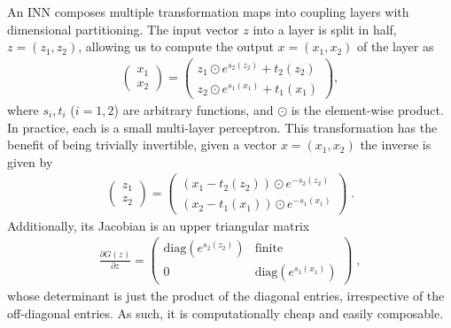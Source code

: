 An INN composes multiple transformation maps into coupling layers with
dimensional partitioning. The input vector $z$ into a layer is split in
half, $z = (z_1,z_2)$, allowing us to compute the output $x=(x_1,x_2)$
of the layer as
%
\begin{align}
\begin{pmatrix} x_1 \\ x_2 \end{pmatrix} =
\begin{pmatrix}
z_1 \odot e^{s_2(z_2)} + t_2(z_2) \\
z_2 \odot e^{s_1(x_1)} + t_1(x_1)
\end{pmatrix}\label{eq:layer1},
\end{align}
%
where $s_i, t_i$ ($i=1,2$) are arbitrary functions, and $\odot$ is the
element-wise product. In practice, each is a small multi-layer
perceptron. This transformation has the benefit of being trivially
invertible, given a vector $x=(x_1,x_2)$ the inverse is given by
%
\begin{align}
\begin{pmatrix} z_1 \\ z_2 \end{pmatrix} =
\begin{pmatrix}
(x_1 - t_2(z_2)) \odot e^{-s_2(z_2)} \\
(x_2 - t_1(x_1)) \odot e^{-s_1(x_1)}
\end{pmatrix} \; .
\label{eq:layer2}
\end{align}
%
Additionally, its Jacobian is an upper triangular matrix
%
\begin{align}
\frac{\partial G(z)}{\partial z} =
\begin{pmatrix}
\text{diag}\left(e^{s_2(z_2)}\right) & \text{finite} \\
0 & \text{diag}\left(e^{s_1(x_1)}\right)
\end{pmatrix}  \; ,
\end{align}
%
whose determinant is just the product of the diagonal entries,
irrespective of the off-diagonal entries. As such, it is
computationally cheap and easily composable.

